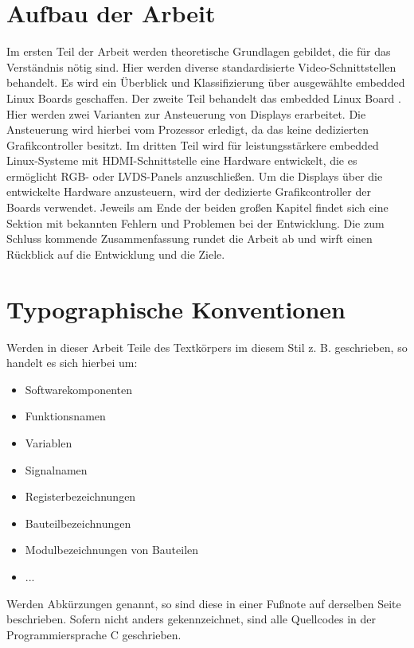 \section{Aufbau der Arbeit}
Im ersten Teil der Arbeit werden theoretische Grundlagen gebildet, die für das Verständnis nötig sind. Hier werden diverse standardisierte Video-Schnittstellen behandelt. Es wird ein Überblick und Klassifizierung über ausgewählte embedded Linux Boards geschaffen.
Der zweite Teil behandelt das embedded Linux Board . Hier werden zwei Varianten zur Ansteuerung von Displays erarbeitet. Die Ansteuerung wird hierbei vom Prozessor erledigt, da das  keine dedizierten Grafikcontroller besitzt.
Im dritten Teil wird für leistungsstärkere embedded Linux-Systeme mit HDMI-Schnittstelle eine Hardware entwickelt, die es ermöglicht RGB- oder LVDS-Panels anzuschließen. Um die Displays über die entwickelte Hardware anzusteuern, wird der dedizierte Grafikcontroller der Boards verwendet. Jeweils am Ende der beiden großen Kapitel findet sich eine Sektion mit bekannten Fehlern und Problemen bei der Entwicklung. Die zum Schluss kommende Zusammenfassung rundet die Arbeit ab und wirft einen Rückblick auf die Entwicklung und die Ziele.

\section{Typographische Konventionen}
Werden in dieser Arbeit Teile des Textkörpers im diesem Stil z. B.  geschrieben, so handelt es sich hierbei um:
\begin{itemize}
\item Softwarekomponenten
\item Funktionsnamen
\item Variablen
\item Signalnamen
\item Registerbezeichnungen
\item Bauteilbezeichnungen
\item Modulbezeichnungen von Bauteilen
\item ...
\end{itemize}
Werden Abkürzungen genannt, so sind diese in einer Fußnote auf derselben Seite beschrieben.
Sofern nicht anders gekennzeichnet, sind alle Quellcodes in der Programmiersprache C geschrieben.
